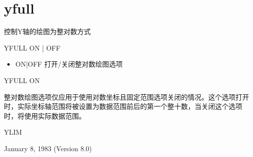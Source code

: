 \section{yfull}
\label{cmd:yfull}

控制Y轴的绘图为整对数方式

YFULL ON | OFF

\begin{itemize}
\item ON|OFF 打开/关闭整对数绘图选项
\end{itemize}

YFULL ON

整对数绘图选项仅应用于使用对数坐标且固定范围选项关闭的情况。这个选项打开时，实际坐标轴范围将被设置为数据范围前后的第一个整十数，当关闭这个选项时，将使用实际数据范围。

YLIM

January 8, 1983 (Version 8.0)
